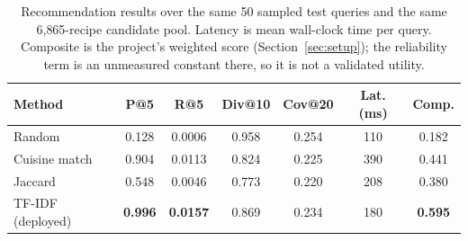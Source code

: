 \begin{table}[t]
\caption{Recommendation results over the same 50 sampled test queries and the
same 6{,}865-recipe candidate pool. Latency is mean wall-clock time per query.
Composite is the project's weighted score (Section~\ref{sec:setup}); the
reliability term is an unmeasured constant there, so it is not a validated utility.}
\label{tab:results}
\centering
\scriptsize
\setlength{\tabcolsep}{2.6pt}
\begin{tabular}{@{}lcccccc@{}}
\toprule
\textbf{Method} & \textbf{P@5} & \textbf{R@5} & \textbf{Div@10} & \textbf{Cov@20} & \textbf{Lat. (ms)} & \textbf{Comp.} \\
\midrule
Random            & 0.128 & 0.0006 & 0.958 & 0.254 & 110 & 0.182 \\
Cuisine match     & 0.904 & 0.0113 & 0.824 & 0.225 & 390 & 0.441 \\
Jaccard           & 0.548 & 0.0046 & 0.773 & 0.220 & 208 & 0.380 \\
TF-IDF (deployed) & \textbf{0.996} & \textbf{0.0157} & 0.869 & 0.234 & 180 & \textbf{0.595} \\
\bottomrule
\end{tabular}
\end{table}
